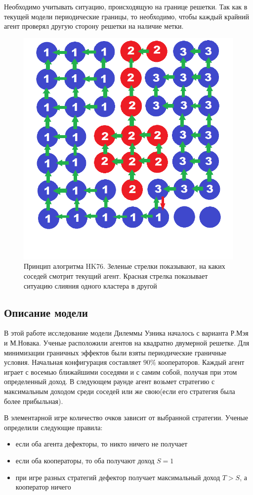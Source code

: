 \documentclass[a4paper]{article}
\begin{document}
	\par Необходимо учитывать ситуацию, происходящую на границе решетки. Так как в текущей модели периодические границы, то необходимо, чтобы каждый крайний агент проверял другую сторону решетки на наличие метки.
	\begin{figure}[H]
		\centering
		\includegraphics[width=0.5\linewidth]{HKpic2.png}
		\caption{Принцип алогритма HK76. Зеленые стрелки показывают, на каких соседей смотрит текущий агент. Красная стрелка показывает ситуацию слияния одного кластера в другой}
		\label{hkpic}
	\end{figure}
	
	
	\subsection{Описание модели}
	\par В этой работе исследование модели Дилеммы Узника началось с варианта Р.Мэя и М.Новака\cite{may_nowak92}. Ученые расположили агентов на квадратно двумерной решетке. Для минимизации граничных эффектов были взяты периодические граничные условия. Начальная конфигурация составляет $90\%$ кооператоров. Каждый агент играет с восемью ближайшими соседями и с самим собой, получая при этом определенный доход. В следующем раунде агент возьмет стратегию с максимальным доходом среди соседей или же свою(если его стратегия была более прибыльная).
	
	\par В элементарной игре количество очков зависит от выбранной стратегии. Ученые определили следующие правила:
	\begin{itemize}
		\item если оба агента дефекторы, то никто ничего не получает
		\item если оба кооператоры, то оба получают доход $S=1$
		\item при игре разных стратегий дефектор получает максимальный доход $T>S$, а кооператор ничего
	\end{itemize}
	
\end{document}
